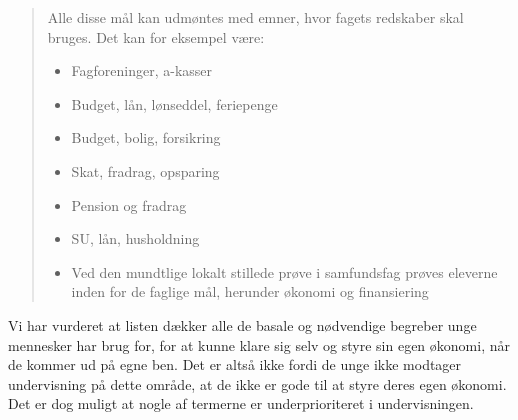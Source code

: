 \begin{quotation}
\begin{description}
\item{Alle disse mål kan udmøntes med emner, hvor fagets redskaber skal bruges. Det kan for eksempel være:}
\noindent \begin{itemize}
\item{Fagforeninger, a-kasser}
\item{Budget, lån, lønseddel, feriepenge}
\item{Budget, bolig, forsikring}
\item{Skat, fradrag, opsparing}
\item{Pension og fradrag}
\item{SU, lån, husholdning}
\item{Ved den mundtlige lokalt stillede prøve i samfundsfag prøves eleverne inden for de faglige mål, herunder økonomi og finansiering}
\cite{FallesMalSamfundsfag}
\end{itemize}
\end{description}
\end{quotation}

Vi har vurderet at listen dækker alle de basale og nødvendige begreber unge mennesker har brug for, for at kunne klare sig selv og styre sin egen økonomi, når de kommer ud på egne ben. Det er altså ikke fordi de unge ikke modtager undervisning på dette område, at de ikke er gode til at styre deres egen økonomi. Det er dog muligt at nogle af termerne er underprioriteret i undervisningen.

